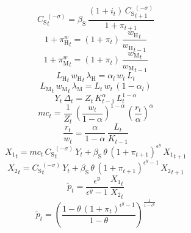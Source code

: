 \begin{dmath}
{C_\mathrm{S}}_{t}^{\left(-{\sigma}\right)}={\beta_\mathrm{S}}\, \frac{\left(1+{i}_{t}\right)\, {C_\mathrm{S}}_{t+1}^{\left(-{\sigma}\right)}}{1+{\pi}_{t+1}}
\end{dmath}
\begin{dmath}
1+{\pi^w_\mathrm{H}}_{t}=\left(1+{\pi}_{t}\right)\, \frac{{w_\mathrm{H}}_{t}}{{w_\mathrm{H}}_{t-1}}
\end{dmath}
\begin{dmath}
1+{\pi^w_\mathrm{M}}_{t}=\left(1+{\pi}_{t}\right)\, \frac{{w_\mathrm{M}}_{t}}{{w_\mathrm{M}}_{t-1}}
\end{dmath}
\begin{dmath}
{L_\mathrm{H}}_{t}\, {w_\mathrm{H}}_{t}\, {\lambda_\mathrm{H}}={\alpha_l}\, {w}_{t}\, {L}_{t}
\end{dmath}
\begin{dmath}
{L_\mathrm{M}}_{t}\, {w_\mathrm{M}}_{t}\, {\lambda_\mathrm{M}}={L}_{t}\, {w}_{t}\, \left(1-{\alpha_l}\right)
\end{dmath}
\begin{dmath}
{Y}_{t}\, {\Delta}_{t}={Z}_{t}\, {K}_{t-1}^{{\alpha}}\, {L}_{t}^{1-{\alpha}}
\end{dmath}
\begin{dmath}
{mc}_{t}=\frac{1}{{Z}_{t}}\, \left(\frac{{w}_{t}}{1-{\alpha}}\right)^{1-{\alpha}}\, \left(\frac{{r}_{t}}{{\alpha}}\right)^{{\alpha}}
\end{dmath}
\begin{dmath}
\frac{{r}_{t}}{{w}_{t}}=\frac{{\alpha}}{1-{\alpha}}\, \frac{{L}_{t}}{{K}_{t-1}}
\end{dmath}
\begin{dmath}
{X_1}_{t}={mc}_{t}\, {C_\mathrm{S}}_{t}^{\left(-{\sigma}\right)}\, {Y}_{t}+{\beta_\mathrm{S}}\, {\theta}\, \left(1+{\pi}_{t+1}\right)^{{\epsilon^y}}\, {X_1}_{t+1}
\end{dmath}
\begin{dmath}
{X_2}_{t}={C_\mathrm{S}}_{t}^{\left(-{\sigma}\right)}\, {Y}_{t}+{\beta_\mathrm{S}}\, {\theta}\, \left(1+{\pi}_{t+1}\right)^{{\epsilon^y}-1}\, {X_2}_{t+1}
\end{dmath}
\begin{dmath}
{\tilde{p}}_{t}=\frac{{\epsilon^y}}{{\epsilon^y}-1}\, \frac{{X_1}_{t}}{{X_2}_{t}}
\end{dmath}
\begin{dmath}
{\tilde{p}}_{t}=\left(\frac{1-{\theta}\, \left(1+{\pi}_{t}\right)^{{\epsilon^y}-1}}{1-{\theta}}\right)^{\frac{1}{1-{\epsilon^y}}}
\end{dmath}
